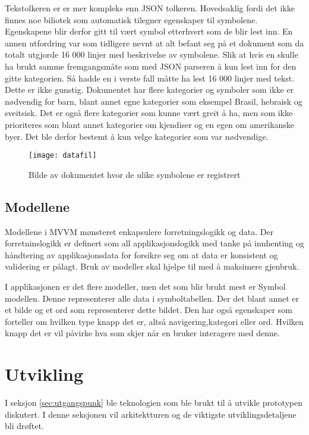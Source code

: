 {Tekstolkeren er er mer kompleks enn JSON tolkeren. Hovedsaklig fordi det ikke finnes noe biliotek som automatisk tilegner egenskaper til symbolene. Egenskapene blir derfor gitt til vært symbol etterhvert som de blir lest inn. En annen utfordring var som tidligere nevnt at alt befant seg på et dokument som da totalt utgjorde 16 000 linjer med beskrivelse av symbolene. Slik at hvis en skulle ha brukt samme fremgangsmåte som med JSON parseren å kun lest inn for den gitte kategorien. Så hadde en i verste fall måtte ha lest 16 000 linjer med tekst. Dette er ikke gunstig. Dokumentet har flere kategorier og symboler som ikke er nødvendig for barn, blant annet egne kategorier som eksempel Brasil, hebraisk og sveitsisk. Det er også flere kategorier som kunne vært greit å ha, men som ikke prioriteres som blant annet kategorier om kjendiser og en egen om amerikanske byer. Det ble derfor bestemt å kun velge kategorier som var nødvendige.

\begin{figure}[ht!] 
\centering 
\texttt{[image: datafil]} 
\caption{Bilde av dokumentet hvor de ulike symbolene er registrert} 
\label{fig:dok} 
\end{figure} 


\subsection{Modellene}

Modellene i MVVM mønsteret enkapsulere forretningslogikk og data. Der forretninslogikk er definert som all applikasjonslogikk med tanke på innhenting og håndtering av applikasjonsdata for forsikre seg om at data er konsistent og validering er pålagt. Bruk av modeller skal hjelpe til med å maksimere gjenbruk.

I applikasjonen er det flere modeller, men det som blir brukt mest er Symbol modellen. Denne representerer alle data i symboltabellen. Der det blant annet er et bilde og et ord som representerer dette bildet. Den har også egenskaper som forteller om hvilken type knapp det er, altså navigering,kategori eller ord. Hvilken knapp det er vil påvirke hva som skjer når en bruker interagere med denne.



\section{Utvikling}  
 
 
I seksjon \ref{sec:utgangspunk} ble teknologien som ble brukt til å utvikle prototypen diskutert. I denne seksjonen vil arkitektturen og de viktigste utviklingsdetaljene  bli drøftet.  
 
}
